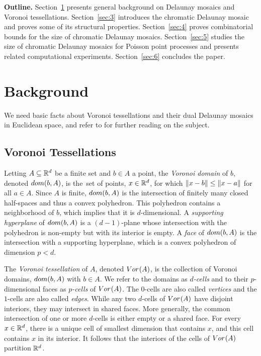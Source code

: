\documentclass[a4paper]{article}
\newcommand {\mm}[1]   {\ifmmode{#1}\else{\mbox{\(#1\)}}\fi}
\newcommand{\Rspace}        {\mm{{\mathbb R}}}
\newcommand{\domain}[2]     {\mm{{\rm dom}{({#1},{#2})}}}
\newcommand{\Voronoi}[2]    {\mm{{\rm Vor}_{#1}{({#2})}}}
\newcommand{\Edist}[2]      {\mm{\|{#1}-{#2}\|}}
\theoremstyle{definition}
\numberwithin{theorem}{section}
\numberwithin{equation}{section}
\begin{document}
\medskip \noindent \textbf{Outline.}
Section~\ref{sec:2} presents general background on Delaunay mosaics and Voronoi tessellations.
Section~\ref{sec:3} introduces the chromatic Delaunay mosaic and proves some of its structural properties.
Section~\ref{sec:4} proves combinatorial bounds for the size of chromatic Delaunay mosaics.
Section~\ref{sec:5} studies the size of chromatic Delaunay mosaics for Poisson point processes and presents related computational experiments.
Section~\ref{sec:6} concludes the paper.


\section{Background}
\label{sec:2}

We need basic facts about Voronoi tessellations and their dual Delaunay mosaics in Euclidean space, and refer to \cite{AKL13} for further reading on the subject.

\subsection{Voronoi Tessellations}
\label{sec:2.1}

Letting $A \subseteq \Rspace^d$ be a finite set and $b \in A$ a point, the \emph{Voronoi domain} of $b$, denoted $\domain{b}{A}$, is the~set of points, $x \in \Rspace^d$, for which $\Edist{x}{b} \leq \Edist{x}{a}$ for all $a \in A$.
Since $A$ is finite, $\domain{b}{A}$ is the intersection of finitely many closed half-spaces and thus a convex polyhedron.
This polyhedron contains a neighborhood of $b$, which implies that it is $d$-dimensional.
A \emph{supporting hyperplane} of $\domain{b}{A}$ is a $(d-1)$-plane
whose intersection with the polyhedron is non-empty but with its interior is empty.
A \emph{face} of $\domain{b}{A}$ is the intersection with a supporting hyperplane, which is a convex polyhedron of dimension $p < d$.

The \emph{Voronoi tessellation} of $A$, denoted $\Voronoi{}{A}$, is the collection of Voronoi domains, $\domain{b}{A}$ with $b \in A$.
We refer to the domains as \emph{$d$-cells} and to their $p$-dimensional faces as \emph{$p$-cells} of $\Voronoi{}{A}$.
The $0$-cells are also called \emph{vertices} and the $1$-cells are also called \emph{edges}.
While any two $d$-cells of $\Voronoi{}{A}$ have disjoint interiors, they may intersect in shared faces.
More generally, the common intersection of one or more $d$-cells is either empty or a shared face.
For every $x \in \Rspace^d$, there is a unique cell of smallest dimension that contains $x$, and this cell contains $x$ in its interior.
It follows that the interiors of the cells of $\Voronoi{}{A}$ partition $\Rspace^d$.
\end{document}
